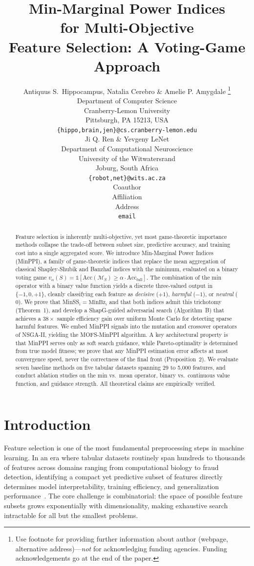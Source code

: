 \documentclass{article} %
\title{Min-Marginal Power Indices \\ for Multi-Objective \\ Feature Selection: A Voting-Game Approach}
\author{Antiquus S.~Hippocampus, Natalia Cerebro \& Amelie P. Amygdale \thanks{ Use footnote for providing further information
about author (webpage, alternative address)---\emph{not} for acknowledging
funding agencies.  Funding acknowledgements go at the end of the paper.} \\
Department of Computer Science\\
Cranberry-Lemon University\\
Pittsburgh, PA 15213, USA \\
\texttt{\{hippo,brain,jen\}@cs.cranberry-lemon.edu} \\
\And
Ji Q. Ren \& Yevgeny LeNet \\
Department of Computational Neuroscience \\
University of the Witwatersrand \\
Joburg, South Africa \\
\texttt{\{robot,net\}@wits.ac.za} \\
\AND
Coauthor \\
Affiliation \\
Address \\
\texttt{email}
}
\begin{document}
\maketitle

\begin{abstract}
Feature selection is inherently multi-objective, yet most game-theoretic importance methods collapse the trade-off between subset size, predictive accuracy, and training cost into a single aggregated score. We introduce Min-Marginal Power Indices (MinPPI), a family of game-theoretic indices that replace the mean aggregation of classical Shapley-Shubik and Banzhaf indices with the minimum, evaluated on a binary voting game $v_\alpha(S) = \mathbb{1}[\text{Acc}(\mathcal{M}_S) \geq \alpha \cdot \text{Acc}_{\text{full}}]$. The combination of the min operator with a binary value function yields a discrete three-valued output in $\{-1, 0, +1\}$, cleanly classifying each feature as \emph{decisive} ($+1$), \emph{harmful} ($-1$), or \emph{neutral} ($0$). We prove that MinSS$_i = \text{MinBz}_i$ and that both indices admit this trichotomy (Theorem~1), and develop a ShapG-guided adversarial search (Algorithm~B) that achieves a $38\times$ sample efficiency gain over uniform Monte Carlo for detecting sparse harmful features. We embed MinPPI signals into the mutation and crossover operators of NSGA-II, yielding the MOFS-MinPPI algorithm. A key architectural property is that MinPPI serves only as soft search guidance, while Pareto-optimality is determined from true model fitness; we prove that any MinPPI estimation error affects at most convergence speed, never the correctness of the final front (Proposition~2). We evaluate seven baseline methods on five tabular datasets spanning 29 to 5{,}000 features, and conduct ablation studies on the min vs.\ mean operator, binary vs.\ continuous value function, and guidance strength. All theoretical claims are empirically verified.
\end{abstract}








\section{Introduction}
\label{sec:intro}

Feature selection is one of the most fundamental preprocessing steps in machine learning. In an era where tabular datasets routinely span hundreds to thousands of features across domains ranging from computational biology to fraud detection, identifying a compact yet predictive subset of features directly determines model interpretability, training efficiency, and generalization performance~\citep{guyon2003introduction,chandrashekar2014survey}. The core challenge is combinatorial: the space of possible feature subsets grows exponentially with dimensionality, making exhaustive search intractable for all but the smallest problems.
\end{document}
